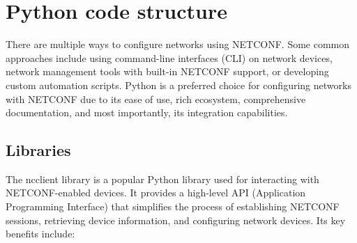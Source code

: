 \section{Python code structure}

There are multiple ways to configure networks using NETCONF. Some common approaches include using command-line interfaces (CLI) on network devices, network management tools with built-in NETCONF support, or developing custom automation scripts. Python is a preferred choice for configuring networks with NETCONF due to its ease of use, rich ecosystem, comprehensive documentation, and most importantly, its integration capabilities.

\subsection{Libraries}

The ncclient library is a popular Python library used for interacting with NETCONF-enabled devices. It provides a high-level API (Application Programming Interface) that simplifies the process of establishing NETCONF sessions, retrieving device information, and configuring network devices. Its key benefits include:

